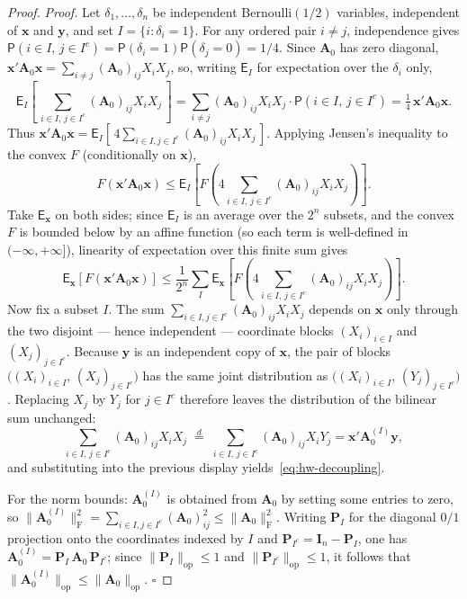\documentclass[14pt]{extarticle}
\theoremstyle{plain}
\theoremstyle{definition}
\theoremstyle{remark}
\newcommand\expc{\mathsf{E}}
\newcommand\prb{\mathsf{P}}
\newcommand{\by}{\mathbf{y}}
\newcommand{\bx}{\mathbf{x}}
\newcommand{\bI}{\mathbf{I}}
\newcommand{\bA}{\mathbf{A}}
\newcommand{\bP}{\mathbf{P}}
\newcommand{\opnorm}[1]{\|#1\|_{\mathrm{op}}}
\newcommand{\fnorm}[1]{\|#1\|_{\mathrm{F}}}
\begin{document}
\begin{proof}
\emph{Proof.} Let $\delta_1, \ldots, \delta_n$ be independent $\mathrm{Bernoulli}(1/2)$ variables, independent of $\bx$ and $\by$, and set $I = \{i : \delta_i = 1\}$. For any ordered pair $i \neq j$, independence gives $\prb(i \in I,\, j \in I^c) = \prb(\delta_i = 1)\prb(\delta_j = 0) = 1/4$. Since $\bA_0$ has zero diagonal, $\bx'\bA_0\bx = \sum_{i \neq j}(\bA_0)_{ij}X_iX_j$, so, writing $\expc_I$ for expectation over the $\delta_i$ only,
\[
\expc_I\!\left[\,\sum_{i \in I,\, j \in I^c}(\bA_0)_{ij}X_iX_j\,\right] = \sum_{i \neq j}(\bA_0)_{ij}X_iX_j \cdot \prb(i \in I,\, j \in I^c) = \tfrac{1}{4}\,\bx'\bA_0\bx.
\]
Thus $\bx'\bA_0\bx = \expc_I[\,4\sum_{i \in I, j \in I^c}(\bA_0)_{ij}X_iX_j\,]$. Applying Jensen's inequality to the convex $F$ (conditionally on $\bx$),
\[
F(\bx'\bA_0\bx) \leqslant \expc_I\!\left[F\!\left(4\sum_{i \in I,\, j \in I^c}(\bA_0)_{ij}X_iX_j\right)\right].
\]
Take $\expc_\bx$ on both sides; since $\expc_I$ is an average over the $2^n$ subsets, and the convex $F$ is bounded below by an affine function (so each term is well-defined in $(-\infty, +\infty]$), linearity of expectation over this finite sum gives
\[
\expc_\bx[F(\bx'\bA_0\bx)] \leqslant \frac{1}{2^n}\sum_I \expc_\bx\!\left[F\!\left(4\sum_{i \in I,\, j \in I^c}(\bA_0)_{ij}X_iX_j\right)\right].
\]
Now fix a subset $I$. The sum $\sum_{i \in I, j \in I^c}(\bA_0)_{ij}X_iX_j$ depends on $\bx$ only through the two disjoint --- hence independent --- coordinate blocks $(X_i)_{i \in I}$ and $(X_j)_{j \in I^c}$. Because $\by$ is an independent copy of $\bx$, the pair of blocks $\big((X_i)_{i \in I},\, (X_j)_{j \in I^c}\big)$ has the same joint distribution as $\big((X_i)_{i \in I},\, (Y_j)_{j \in I^c}\big)$. Replacing $X_j$ by $Y_j$ for $j \in I^c$ therefore leaves the distribution of the bilinear sum unchanged:
\[
\sum_{i \in I,\, j \in I^c}(\bA_0)_{ij}X_iX_j \;\overset{d}{=}\; \sum_{i \in I,\, j \in I^c}(\bA_0)_{ij}X_iY_j = \bx'\bA_0^{(I)}\by,
\]
and substituting into the previous display yields~\eqref{eq:hw-decoupling}.

For the norm bounds: $\bA_0^{(I)}$ is obtained from $\bA_0$ by setting some entries to zero, so $\fnorm{\bA_0^{(I)}}^2 = \sum_{i \in I, j \in I^c}(\bA_0)_{ij}^2 \leqslant \fnorm{\bA_0}^2$. Writing $\bP_I$ for the diagonal $0/1$ projection onto the coordinates indexed by $I$ and $\bP_{I^c} = \bI_n - \bP_I$, one has $\bA_0^{(I)} = \bP_I\,\bA_0\,\bP_{I^c}$; since $\opnorm{\bP_I} \leqslant 1$ and $\opnorm{\bP_{I^c}} \leqslant 1$, it follows that $\opnorm{\bA_0^{(I)}} \leqslant \opnorm{\bA_0}$. \hfill$\square$


\end{proof}
\end{document}
